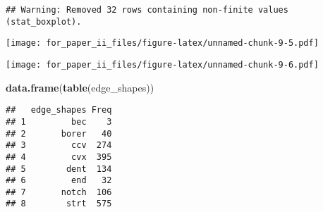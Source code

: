 \documentclass[]{article}
\newenvironment{Shaded}{\begin{snugshade}}{\end{snugshade}}
\newcommand{\KeywordTok}[1]{\textcolor[rgb]{0.13,0.29,0.53}{\textbf{#1}}}
\newcommand{\DataTypeTok}[1]{\textcolor[rgb]{0.13,0.29,0.53}{#1}}
\newcommand{\DecValTok}[1]{\textcolor[rgb]{0.00,0.00,0.81}{#1}}
\newcommand{\FloatTok}[1]{\textcolor[rgb]{0.00,0.00,0.81}{#1}}
\newcommand{\StringTok}[1]{\textcolor[rgb]{0.31,0.60,0.02}{#1}}
\newcommand{\OperatorTok}[1]{\textcolor[rgb]{0.81,0.36,0.00}{\textbf{#1}}}
\newcommand{\NormalTok}[1]{#1}
\begin{document}
\begin{verbatim}
## Warning: Removed 32 rows containing non-finite values (stat_boxplot).
\end{verbatim}

\texttt{[image: for\_paper\_ii\_files/figure-latex/unnamed-chunk-9-5.pdf]}

\begin{Shaded}
\end{Shaded}

\texttt{[image: for\_paper\_ii\_files/figure-latex/unnamed-chunk-9-6.pdf]}

\begin{Shaded}
\begin{Highlighting}[]
\KeywordTok{data.frame}\NormalTok{(}\KeywordTok{table}\NormalTok{(edge_shapes))}
\end{Highlighting}
\end{Shaded}

\begin{verbatim}
##   edge_shapes Freq
## 1         bec    3
## 2       borer   40
## 3         ccv  274
## 4         cvx  395
## 5        dent  134
## 6         end   32
## 7       notch  106
## 8        strt  575
\end{verbatim}
\end{document}
